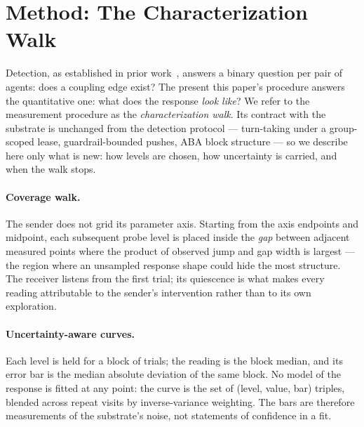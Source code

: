 \documentclass[11pt,a4paper]{article}
\begin{document}
\section{Method: The Characterization Walk}
\label{sec:method}

Detection, as established in prior work~\cite{p1}, answers a binary
question per pair of agents: does a coupling edge exist? The present
this paper's procedure answers the quantitative one: what does the response
\emph{look like}? We refer to the measurement procedure as the
\emph{characterization walk}. Its contract with the substrate is
unchanged from the detection protocol --- turn-taking under a
group-scoped lease, guardrail-bounded pushes, ABA block structure ---
so we describe here only what is new: how levels are chosen, how
uncertainty is carried, and when the walk stops.

\paragraph{Coverage walk.}
The sender does not grid its parameter axis. Starting from the axis
endpoints and midpoint, each subsequent probe level is placed inside
the \emph{gap} between adjacent measured points where the product of
observed jump and gap width is largest --- the region where an
unsampled response shape could hide the most structure. The receiver
listens from the first trial; its quiescence is what makes every
reading attributable to the sender's intervention rather than to its
own exploration.

\paragraph{Uncertainty-aware curves.}
Each level is held for a block of trials; the reading is the block
median, and its error bar is the median absolute deviation of the same
block. No model of the response is fitted at any point: the curve is
the set of (level, value, bar) triples, blended across repeat visits
by inverse-variance weighting. The bars are therefore measurements of
the substrate's noise, not statements of confidence in a fit.
\end{document}
